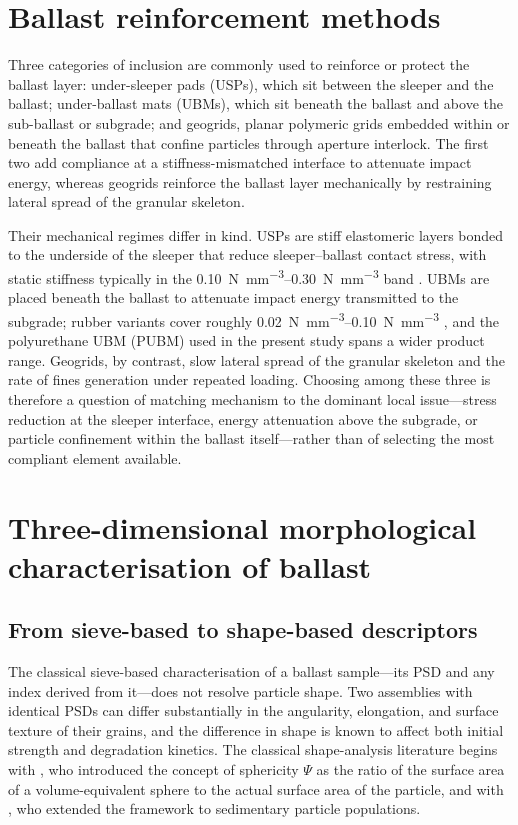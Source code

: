 \section{Ballast reinforcement methods}
\label{sec:reinforcement}

Three categories of inclusion are commonly used to reinforce or protect the ballast layer: under-sleeper pads (USPs), which sit between the sleeper and the ballast; under-ballast mats (UBMs), which sit beneath the ballast and above the sub-ballast or subgrade; and geogrids, planar polymeric grids embedded within or beneath the ballast that confine particles through aperture interlock. The first two add compliance at a stiffness-mismatched interface to attenuate impact energy, whereas geogrids reinforce the ballast layer mechanically by restraining lateral spread of the granular skeleton.

Their mechanical regimes differ in kind. USPs are stiff elastomeric layers bonded to the underside of the sleeper that reduce sleeper--ballast contact stress, with static stiffness typically in the \qtyrange{0.10}{0.30}{\newton\per\mm\cubed} band \citep{jayasuriya2019}. UBMs are placed beneath the ballast to attenuate impact energy transmitted to the subgrade; rubber variants cover roughly \qtyrange{0.02}{0.10}{\newton\per\mm\cubed} \citep{navaratnarajah2017,ngo2019}, and the polyurethane UBM (PUBM) used in the present study spans a wider product range. Geogrids, by contrast, slow lateral spread of the granular skeleton and the rate of fines generation under repeated loading. Choosing among these three is therefore a question of matching mechanism to the dominant local issue---stress reduction at the sleeper interface, energy attenuation above the subgrade, or particle confinement within the ballast itself---rather than of selecting the most compliant element available.

\section{Three-dimensional morphological characterisation of ballast}
\label{sec:morphology-review}

\subsection{From sieve-based to shape-based descriptors}
\label{sec:shape-descriptors}

The classical sieve-based characterisation of a ballast sample---its PSD and any index derived from it---does not resolve particle shape. Two assemblies with identical PSDs can differ substantially in the angularity, elongation, and surface texture of their grains, and the difference in shape is known to affect both initial strength and degradation kinetics. The classical shape-analysis literature begins with \citet{wadell1932}, who introduced the concept of sphericity $\Psi$ as the ratio of the surface area of a volume-equivalent sphere to the actual surface area of the particle, and with \citet{krumbein1941}, who extended the framework to sedimentary particle populations.

